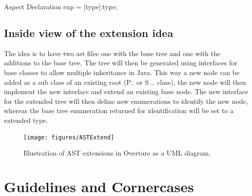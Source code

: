 \documentclass{overturerepchap}
\begin{document}
\begin{astlst}[\lstset{caption=Example showing how a type can be added to all expressions.,label=extendedAstEx}]
Aspect Declaration
exp = [type]:type;
\end{astlst}

\subsection{Inside view of the extension idea}
The idea is to have two ast files one with the base tree and one with the additions to the base tree. The tree will then be generated using interfaces for base classes to allow multiple inheritance in Java. This way a new node can be added as a sub class of an existing root (P.. or S .. class), the new node will then implement the new interface and extend an existing base node. The new interface for the extended tree will then define new enumerations to identify the new node, whereas the base tree enumeration returned for identification will be set to a extended type.

\begin{figure}[tbh]
\centering
\texttt{[image: figures/ASTExtend]}
\caption{Illustration of AST extensions in Overture as a UML diagram.\label{fig:ASTExtend}}
\end{figure}

\section{Guidelines and Cornercases}
\end{document}
